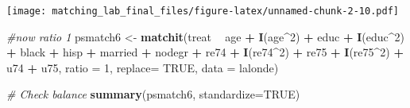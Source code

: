 \documentclass[]{article}
\newenvironment{Shaded}{\begin{snugshade}}{\end{snugshade}}
\newcommand{\CommentTok}[1]{\textcolor[rgb]{0.56,0.35,0.01}{\textit{#1}}}
\newcommand{\DataTypeTok}[1]{\textcolor[rgb]{0.13,0.29,0.53}{#1}}
\newcommand{\DecValTok}[1]{\textcolor[rgb]{0.00,0.00,0.81}{#1}}
\newcommand{\KeywordTok}[1]{\textcolor[rgb]{0.13,0.29,0.53}{\textbf{#1}}}
\newcommand{\NormalTok}[1]{#1}
\newcommand{\OperatorTok}[1]{\textcolor[rgb]{0.81,0.36,0.00}{\textbf{#1}}}
\newcommand{\OtherTok}[1]{\textcolor[rgb]{0.56,0.35,0.01}{#1}}
\newcommand{\StringTok}[1]{\textcolor[rgb]{0.31,0.60,0.02}{#1}}
\begin{document}
\texttt{[image: matching\_lab\_final\_files/figure-latex/unnamed-chunk-2-10.pdf]}

\begin{Shaded}
\begin{Highlighting}[]
\CommentTok{#now ratio 1}
\NormalTok{psmatch6 <-}\StringTok{ }\KeywordTok{matchit}\NormalTok{(treat }\OperatorTok{~}\StringTok{ }\NormalTok{age }\OperatorTok{+}\StringTok{ }\KeywordTok{I}\NormalTok{(age}\OperatorTok{^}\DecValTok{2}\NormalTok{) }\OperatorTok{+}\StringTok{ }\NormalTok{educ }\OperatorTok{+}\StringTok{ }\KeywordTok{I}\NormalTok{(educ}\OperatorTok{^}\DecValTok{2}\NormalTok{) }\OperatorTok{+}\StringTok{ }\NormalTok{black }\OperatorTok{+}
\StringTok{                      }\NormalTok{hisp }\OperatorTok{+}\StringTok{ }\NormalTok{married }\OperatorTok{+}\StringTok{ }\NormalTok{nodegr }\OperatorTok{+}\StringTok{ }\NormalTok{re74  }\OperatorTok{+}\StringTok{ }\KeywordTok{I}\NormalTok{(re74}\OperatorTok{^}\DecValTok{2}\NormalTok{) }\OperatorTok{+}\StringTok{ }\NormalTok{re75 }\OperatorTok{+}\StringTok{ }\KeywordTok{I}\NormalTok{(re75}\OperatorTok{^}\DecValTok{2}\NormalTok{) }\OperatorTok{+}
\StringTok{                      }\NormalTok{u74 }\OperatorTok{+}\StringTok{ }\NormalTok{u75,     }\DataTypeTok{ratio =} \DecValTok{1}\NormalTok{, }\DataTypeTok{replace=} \OtherTok{TRUE}\NormalTok{, }\DataTypeTok{data =}\NormalTok{ lalonde)}

\CommentTok{# Check balance}
\KeywordTok{summary}\NormalTok{(psmatch6, }\DataTypeTok{standardize=}\OtherTok{TRUE}\NormalTok{)}
\end{Highlighting}
\end{Shaded}
\end{document}
